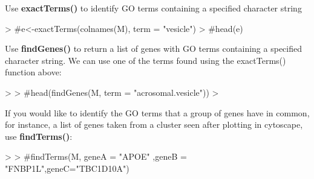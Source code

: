 \documentclass{article}
\begin{document}
Use \textbf{exactTerms()} to identify GO terms containing a specified character string
\begin{Schunk}
\begin{Sinput}
> #e<-exactTerms(colnames(M), term = "vesicle")
> #head(e)
\end{Sinput}
\end{Schunk}
\vspace{4mm}
Use \textbf{findGenes()} to return a list of genes with GO terms containing a specified character string.  We can use one of the terms found using the exactTerms() function above:
\begin{Schunk}
\begin{Sinput}
> 
> #head(findGenes(M, term = "acrosomal.vesicle"))
> 
\end{Sinput}
\end{Schunk}
\vspace{4mm}

If you would like to identify the GO terms that a group of genes have in common, for instance, a list of genes taken from a cluster seen after plotting in cytoscape, use \textbf{findTerms()}:
\begin{Schunk}
\begin{Sinput}
> 
> #findTerms(M, geneA = "APOE" ,geneB = "FNBP1L",geneC="TBC1D10A")
\end{Sinput}
\end{Schunk}
\end{document}
